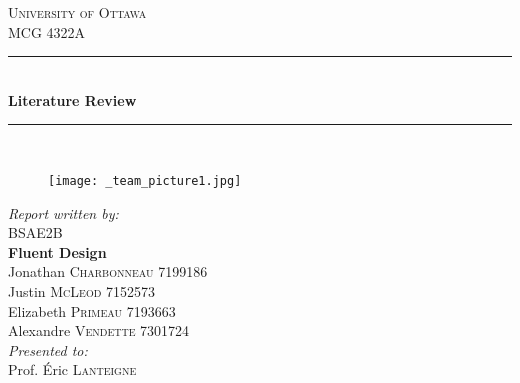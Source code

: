 \documentclass[12pt,twoside]{article}
\begin{document}
	
	\begin{titlepage}
		
		\newcommand{\HRule}{\rule{\linewidth}{0.5mm}} %
		
		\begin{center} %
			
			
			\textsc{\LARGE University of Ottawa}\\[1.0cm] %
			\textsc{\Large MCG 4322A}\\[0.5cm] %
			
			
			\HRule \\[0.4cm]
			{ \huge \bfseries Literature Review}\\[0.4cm] %
			\HRule \\[0.5cm]
			
			\begin{figure}[H]
				\centering
				\texttt{[image: \_team\_picture1.jpg]} %
			\end{figure}
			
			
			\emph{Report written by:}\\[0.5cm]
			BSAE2B\\
			\textbf{Fluent Design}\\
			Jonathan \textsc{Charbonneau} 7199186\\
			Justin \textsc{McLeod} 7152573\\
			Elizabeth \textsc{Primeau} 7193663\\
			Alexandre \textsc{Vendette} 7301724\\[1cm]
			\emph{Presented to:}\\[0.5cm]
			Prof. Éric \textsc{Lanteigne}\\[1.5cm]
			

\end{center}
\end{titlepage}
\end{document}
